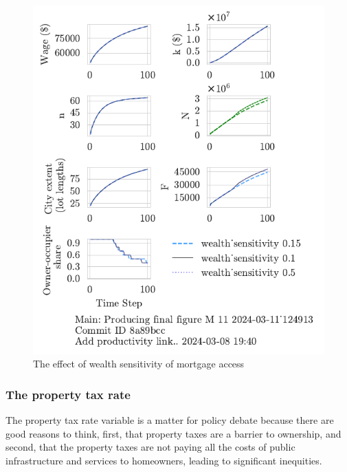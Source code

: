 \begin{figure}[h!bt]
    \centering
    \includegraphics[scale=.8, trim={0 1.4cm 0 0},clip]{fig/wealth_sensitivity-124913.pdf}
    \caption{The effect of wealth sensitivity of mortgage access}
    \label{fig:wealth_sensitivity_ownership_trajectory}
\end{figure}

\newpage

\subsubsection{The property tax rate}

The property tax rate variable is a matter for policy debate because there are good reasons to think, first, that property taxes are a barrier to ownership, and second, that the property taxes are not paying all the costs of public infrastructure and services to homeowners, leading to significant inequities.

